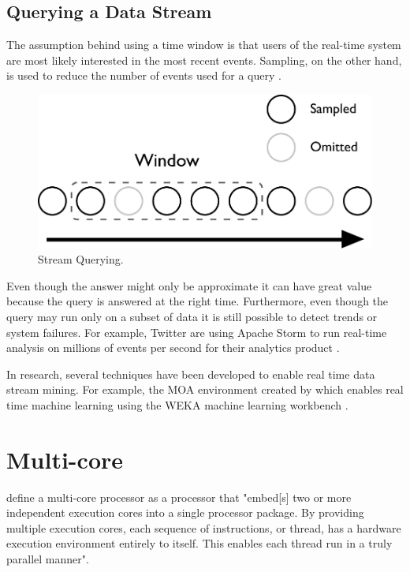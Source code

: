 \subsection{Querying a Data Stream}

The assumption behind using a time window is that users of the real-time system are most likely interested in the most recent events. Sampling, on the other hand, is used to reduce the number of events used for a query \citep{Gaber:2005:MDS:1083784.1083789}.

\begin{figure}[!htb]
	\centering
	\includegraphics[scale=0.5]{pdf/stream.pdf}
	\caption{Stream Querying.}
	\label{fig:stream}
\end{figure}

Even though the answer might only be approximate it can have great value because the query is answered at the right time. Furthermore, even though the query may run only on a subset of data it is still possible to detect trends or system failures. For example, Twitter are using Apache Storm to run real-time analysis on millions of events per second for their analytics product \citep{Solovey}.

In research, several techniques have been developed to enable real time data stream mining. For example, the MOA environment created by \citet{Bifet:2010:MMO:1756006.1859903} which enables real time machine learning using the WEKA machine learning workbench \citep{Holmes1994}.

\section{Multi-core}
\label{sec:multicore}

\citet{akhter2006multi} define a multi-core processor as a processor that "embed[s] two or more independent execution cores into a single processor package. By providing multiple execution cores, each sequence of instructions, or thread, has a hardware execution environment entirely to itself. This enables each thread run in a truly parallel manner".

